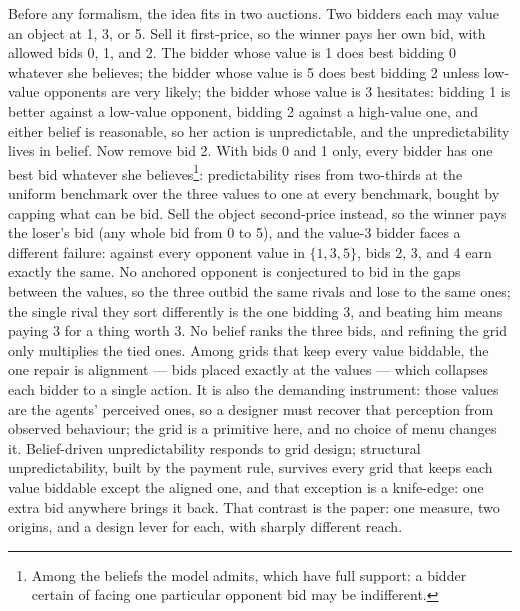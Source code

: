 \documentclass[12pt]{article}
\theoremstyle{definition}
\begin{document}
Before any formalism, the idea fits in two auctions. Two bidders each may value an object at 1, 3, or 5. Sell it first-price, so the winner pays her own bid, with allowed bids 0, 1, and 2. The bidder whose value is 1 does best bidding 0 whatever she believes; the bidder whose value is 5 does best bidding 2 unless low-value opponents are very likely; the bidder whose value is 3 hesitates: bidding 1 is better against a low-value opponent, bidding 2 against a high-value one, and either belief is reasonable, so her action is unpredictable, and the unpredictability lives in belief. Now remove bid 2. With bids 0 and 1 only, every bidder has one best bid whatever she believes\footnote{Among the beliefs the model admits, which have full support: a bidder certain of facing one particular opponent bid may be indifferent.}: predictability rises from two-thirds at the uniform benchmark over the three values to one at every benchmark, bought by capping what can be bid. Sell the object second-price instead, so the winner pays the loser's bid (any whole bid from 0 to 5), and the value-3 bidder faces a different failure: against every opponent value in $\{1,3,5\}$, bids 2, 3, and 4 earn exactly the same. No anchored opponent is conjectured to bid in the gaps between the values, so the three outbid the same rivals and lose to the same ones; the single rival they sort differently is the one bidding 3, and beating him means paying 3 for a thing worth 3. No belief ranks the three bids, and refining the grid only multiplies the tied ones. Among grids that keep every value biddable, the one repair is alignment --- bids placed exactly at the values --- which collapses each bidder to a single action. It is also the demanding instrument: those values are the agents' perceived ones, so a designer must recover that perception from observed behaviour; the grid is a primitive here, and no choice of menu changes it. Belief-driven unpredictability responds to grid design; structural unpredictability, built by the payment rule, survives every grid that keeps each value biddable except the aligned one, and that exception is a knife-edge: one extra bid anywhere brings it back. That contrast is the paper: one measure, two origins, and a design lever for each, with sharply different reach.
\end{document}
